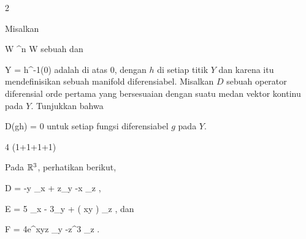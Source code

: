 {2}
{

Misalkan

\mavergleichskette
{\vergleichskette
{ W
}
{ \subseteq }{ \R^n
}
{  }{
}
{    }{
}
{   }{
}
}
{}{}{}
 { W } { \R
} {}
sebuah
dan

\mavergleichskette
{\vergleichskette
{ Y
}
{ = }{ h^{-1}(0)
}
{  }{
}
{    }{
}
{   }{
}
}
{}{}{}
adalah
di atas $0$, dengan $h$
di setiap titik $Y$ dan karena itu mendefinisikan sebuah manifold diferensiabel. Misalkan $D$ sebuah operator diferensial orde pertama yang bersesuaian dengan suatu medan vektor kontinu pada $Y$. Tunjukkan bahwa

\mavergleichskettedisp
{\vergleichskette
{ D(gh)
}
{ =} { 0
}
{ } {
}
{ } {
}
{ } {
}
}
{}{}{}
untuk setiap fungsi diferensiabel $g$ pada $Y$.

}
{} {}

{4 (1+1+1+1)}
{

Pada ${\mathbb R}^3$, perhatikan
berikut,

\mavergleichskettedisp
{\vergleichskette
{ D
}
{ =} { -y \partial_x  + z\partial_y -x \partial_z
}
{ } {
}
{ } {
}
{ } {
}
}
{}{}{,}

\mavergleichskettedisp
{\vergleichskette
{ E
}
{ =} { 5 \partial_x - 3\partial_y +  \cos \left(  xy \right)  \partial_z
}
{ } {
}
{ } {
}
{ } {
}
}
{}{}{,}
dan

\mavergleichskettedisp
{\vergleichskette
{ F
}
{ =} { 4e^{xyz} \partial_y -z^3 \partial_z
}
{ } {
}
{ } {
}
{ } {
}
}
{}{}{.}

}
{} {}
